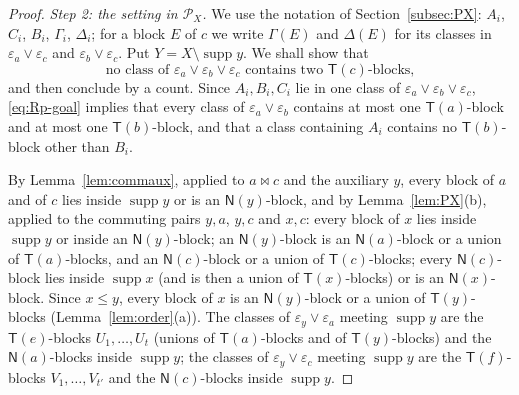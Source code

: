 \documentclass[11pt]{amsart}
\theoremstyle{definition}
\renewcommand{\P}{\mathcal{P}}      %
\newcommand{\supp}{\operatorname{supp}}
\newcommand{\T}{\mathsf{T}}
\newcommand{\N}{\mathsf{N}}
\newcommand{\mt}{\bowtie}      %
\begin{document}
\begin{proof}
\smallskip
\emph{Step 2: the setting in $\P_X$.} We use the notation of Section~\ref{subsec:PX}: $A_i$, $C_i$, $B_i$, $\Gamma_i$, $\Delta_i$; for a block $E$ of $c$ we write $\Gamma(E)$ and $\Delta(E)$ for its classes in $\varepsilon_a\vee\varepsilon_c$ and $\varepsilon_b\vee\varepsilon_c$. Put $Y=X\setminus\supp y$. We shall show that
\begin{equation}\label{eq:Rp-goal}
\text{no class of }\varepsilon_a\vee\varepsilon_b\vee\varepsilon_c\text{ contains two }\T(c)\text{-blocks,}
\end{equation}
and then conclude by a count. Since $A_i,B_i,C_i$ lie in one class of $\varepsilon_a\vee\varepsilon_b\vee\varepsilon_c$, \eqref{eq:Rp-goal} implies that every class of $\varepsilon_a\vee\varepsilon_b$ contains at most one $\T(a)$-block and at most one $\T(b)$-block, and that a class containing $A_i$ contains no $\T(b)$-block other than $B_i$.

By Lemma~\ref{lem:commaux}, applied to $a\mt c$ and the auxiliary $y$, every block of $a$ and of $c$ lies inside $\supp y$ or is an $\N(y)$-block, and by Lemma~\ref{lem:PX}(b), applied to the commuting pairs $y,a$, $y,c$ and $x,c$: every block of $x$ lies inside $\supp y$ or inside an $\N(y)$-block; an $\N(y)$-block is an $\N(a)$-block or a union of $\T(a)$-blocks, and an $\N(c)$-block or a union of $\T(c)$-blocks; every $\N(c)$-block lies inside $\supp x$ (and is then a union of $\T(x)$-blocks) or is an $\N(x)$-block. Since $x\le y$, every block of $x$ is an $\N(y)$-block or a union of $\T(y)$-blocks (Lemma~\ref{lem:order}(a)). The classes of $\varepsilon_y\vee\varepsilon_a$ meeting $\supp y$ are the $\T(e)$-blocks $U_1,\dots,U_t$ (unions of $\T(a)$-blocks and of $\T(y)$-blocks) and the $\N(a)$-blocks inside $\supp y$; the classes of $\varepsilon_y\vee\varepsilon_c$ meeting $\supp y$ are the $\T(f)$-blocks $V_1,\dots,V_{t'}$ and the $\N(c)$-blocks inside $\supp y$.


\end{proof}
\end{document}
